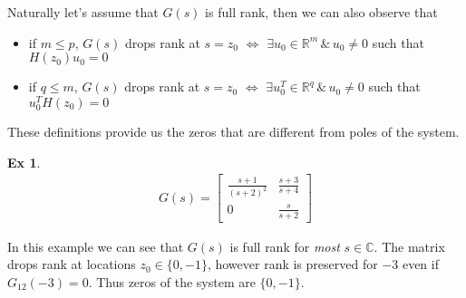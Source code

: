 \documentclass[twoside]{article}
\newtheorem{exmp}[theorem]{Ex}
\begin{document}
Naturally let's assume that $G(s)$ is full rank, then we can also observe that
\begin{itemize}
\item if $m \leq p$, $G(s)$ drops rank at $s = z_0$ $\iff$ $\exists u_0 \in \mathbb{R}^{m} \, \& \, u_0 \neq 0$ such that $H(z_0) u_0 = 0$
\item if $q \leq m$, $G(s)$ drops rank at $s = z_0$ $\iff$ $\exists u_0^T \in \mathbb{R}^{q} \, \& \, u_0 \neq 0$ such that $u_0^T H(z_0) = 0$
\end{itemize}

These definitions provide us the zeros that are different from poles of the system. 

\begin{exmp}
	\begin{align*}
	G(s) = \left[ \begin{array}{ccc} \frac{s+1}{(s+2)^2} & \frac{s+3}{s+4}  \\  
	0 & \frac{s}{s+2}  \end{array} \right]
	\end{align*}
\end{exmp}

In this example we can see that $G(s)$ is full rank for \textit{most} $s \in \mathbb{C}$. The matrix drops rank at locations
$z_0 \in \lbrace 0 , -1 \rbrace$, however rank is preserved for $-3$ even if $G_{12}(-3) = 0$. Thus zeros of the system 
are $\lbrace 0 , -1 \rbrace$.







\end{document}

